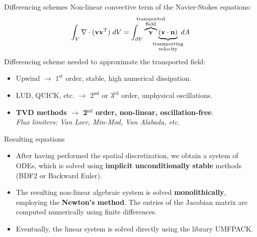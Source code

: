 \documentclass{beamer}
\begin{document}
\begin{frame}{Differencing schemes}
Non-linear convective term of the Navier-Stokes equations:
\begin{equation*}
\int_V \nabla \cdot (\mathbf{v} \mathbf{v}^\mathrm{T}) \; dV = \int_{\partial 
V} 
\overbrace{\mathbf{v}}^{\substack{\text{\makebox[0pt]{transported}} 
		\\ \text{\makebox[0pt]{field}}}} \underbrace{(\mathbf{v} \cdot 
	\mathbf{n})}_{\substack{\text{\makebox[0pt]{transporting}} \\
		\text{\makebox[0pt]{velocity}}}} \; dA
\end{equation*}
Differencing scheme needed to approximate the transported field:
\begin{itemize}
	\item Upwind $\rightarrow$ $1^\text{st}$ order, stable, high numerical dissipation.
	\item LUD, QUICK, etc. $\rightarrow$ $2^\text{nd}$ or $3^\text{rd}$ order, unphysical oscillations.
	\item \textbf{TVD methods $\rightarrow$ 2$^\text{nd}$ order, non-linear, 
	oscillation-free}.\\
	\emph{Flux limiters: Van Leer, Min-Mod, Van Alabada, etc.}
\end{itemize}
\end{frame}
\begin{frame}{Resulting equations}
\begin{itemize}
\item After having performed the spatial discretization, we obtain a system of 
ODEs, which is solved using \textbf{implicit unconditionally stable} methods 
(BDF2 or Backward Euler).
\vspace{0.5cm}

\item The resulting non-linear algebraic system is solved 
\textbf{monolithically}, 
employing the \textbf{Newton's method}. The entries of the Jacobian matrix are 
computed numerically using finite differences.
\vspace{0.5cm}

\item Eventually, the linear system is solved directly using the library 
UMFPACK.
\end{itemize}
\end{frame}
\end{document}
